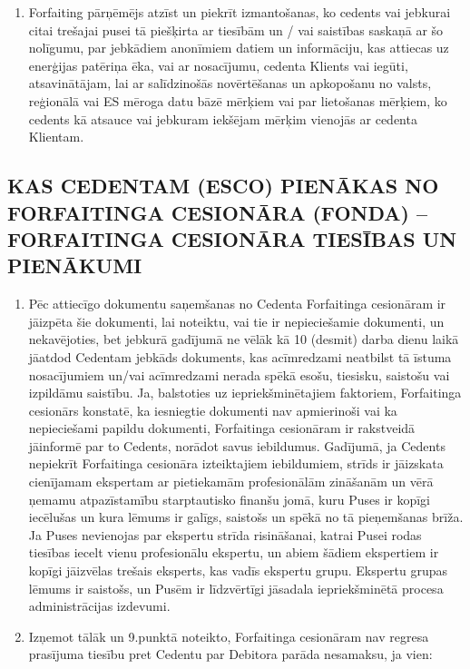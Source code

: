 \documentclass[a4paper]{article}
\begin{document}
\begin{multicols}{2}
\begin{enumerate}
  \item{Forfaiting pārņēmējs atzīst un piekrīt izmantošanas, ko cedents vai
jebkurai citai trešajai pusei tā piešķirta ar tiesībām un / vai saistības
saskaņā ar šo nolīgumu, par jebkādiem anonīmiem datiem un
informāciju, kas attiecas uz enerģijas patēriņa ēka, vai ar nosacījumu,
cedenta Klients vai iegūti, atsavinātājam, lai ar salīdzinošās
novērtēšanas un apkopošanu no valsts, reģionālā vai ES mēroga datu
bāzē mērķiem vai par lietošanas mērķiem, ko cedents kā atsauce vai
jebkuram iekšējam mērķim vienojās ar cedenta Klientam.}
  \end{enumerate}

  \subsection{KAS CEDENTAM (ESCO) PIENĀKAS NO FORFAITINGA
CESIONĀRA (FONDA) – FORFAITINGA CESIONĀRA
TIESĪBAS UN PIENĀKUMI}

  \begin{enumerate}
  \item{Pēc attiecīgo dokumentu saņemšanas no Cedenta Forfaitinga
cesionāram ir jāizpēta šie dokumenti, lai noteiktu, vai tie ir
nepieciešamie dokumenti, un nekavējoties, bet jebkurā gadījumā ne
vēlāk kā 10 (desmit) darba dienu laikā jāatdod Cedentam jebkāds
dokuments, kas acīmredzami neatbilst tā īstuma nosacījumiem un/vai
acīmredzami nerada spēkā esošu, tiesisku, saistošu vai izpildāmu
saistību. Ja, balstoties uz iepriekšminētajiem faktoriem, Forfaitinga
cesionārs konstatē, ka iesniegtie dokumenti nav apmierinoši vai ka
nepieciešami papildu dokumenti, Forfaitinga cesionāram ir rakstveidā
jāinformē par to Cedents, norādot savus iebildumus. Gadījumā, ja
Cedents nepiekrīt Forfaitinga cesionāra izteiktajiem iebildumiem, strīds
ir jāizskata cienījamam ekspertam ar pietiekamām profesionālām
zināšanām un vērā ņemamu atpazīstamību starptautisko finanšu jomā,
kuru Puses ir kopīgi iecēlušas un kura lēmums ir galīgs, saistošs un spēkā
no tā pieņemšanas brīža. Ja Puses nevienojas par ekspertu strīda
risināšanai, katrai Pusei rodas tiesības iecelt vienu profesionālu
ekspertu, un abiem šādiem ekspertiem ir kopīgi jāizvēlas trešais
eksperts, kas vadīs ekspertu grupu. Ekspertu grupas lēmums ir saistošs,
un Pusēm ir līdzvērtīgi jāsadala iepriekšminētā procesa administrācijas
izdevumi.}

  \item{Izņemot tālāk un 9.punktā noteikto, Forfaitinga cesionāram nav
regresa prasījuma tiesību pret Cedentu par Debitora parāda
nesamaksu, ja vien:}


\end{enumerate}
\end{multicols}
\end{document}
